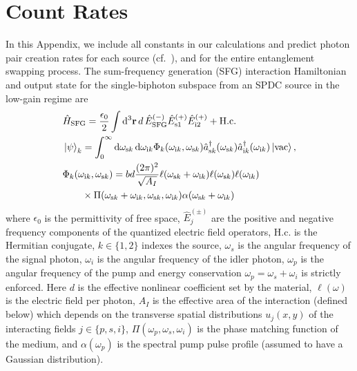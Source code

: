 \documentclass[twocolumn,amssymb, nobibnotes, showpacs, aps, pra,10pt]{revtex4-1}
\newcommand*{\wi}{\omega_{i}}
\newcommand*{\ws}{\omega_{s}}
\newcommand*\diff{\mathop{}\!\mathrm{d}}
\begin{document}
\section{Count Rates} \label{sec:CountRates}
In this Appendix, we include all constants in our calculations and predict photon pair creation rates for each source (cf.\ \cite{Fiorentino2007}), and for the entire entanglement swapping process. The sum-frequency generation (SFG) interaction Hamiltonian and output state for the single-biphoton subspace from an SPDC source in the low-gain regime are
\begin{align} 
&\hat{H}_{\text{SFG}} = \frac{\epsilon_0}{2} \int \diff^3 \mathbf{r} \, d \,\hat{E}_{\text{SFG}}^{(-)} \hat{E}_{\text{s1}}^{(+)} \hat{E}_{\text{i2}}^{(+)} + \text{H.c.} \\
&\ket{\psi}_{k} = \int_0^\infty  \diff \omega_{\text{s}k} \diff \omega_{\text{i}k} \Phi_k (\omega_{\text{i}k}, \omega_{\text{s}k}) \hat{a}_{\text{s}k}^\dagger (\omega_{\text{s}k}) \hat{a}_{\text{i}k}^\dagger (\omega_{\text{i}k}) \ket{\text{vac}}, \label{eq:singleSource} \\
&\Phi_k ( \omega_{\text{i}k}, \omega_{\text{s}k}) = b d \frac{(2 \pi)^2}{\sqrt{A_I}} \ell (\omega_{\text{s}k} + \omega_{\text{i}k}) \ell (\omega_{\text{s}k}) \ell (\omega_{\text{i}k})  \nonumber \\
& \quad \quad \times \Pi (\omega_{\text{s}k} + \omega_{\text{i}k}, \omega_{\text{s}k}, \omega_{\text{i}k}) \alpha (\omega_{\text{s}k} + \omega_{\text{i}k})
\end{align}
where $\epsilon_0$ is the permittivity of free space, $\hat{E}_j^{(\pm)}$ are the positive and negative frequency components of the quantized electric field operators, $\text{H.c.}$ is the Hermitian conjugate, $k \in \{1,2\}$ indexes the source, $\ws$ is the angular frequency of the signal photon, $\omega_i$ is the angular frequency of the idler photon, $\omega_p$ is the angular frequency of the pump and energy conservation $\omega_p = \ws + \wi$ is strictly enforced. Here $d$ is the effective nonlinear coefficient set by the material, $\ell (\omega)$ is the electric field per photon, $A_I$  is the effective area of the interaction (defined below) which depends on the transverse spatial distributions $u_j (x,y)$ of the interacting fields $j \in \{p, s, i \}$, $\Pi (\omega_p, \ws, \wi)$ is the phase matching function of the medium, and $\alpha (\omega_p)$ is the spectral pump pulse profile (assumed to have a Gaussian distribution).
\end{document}
